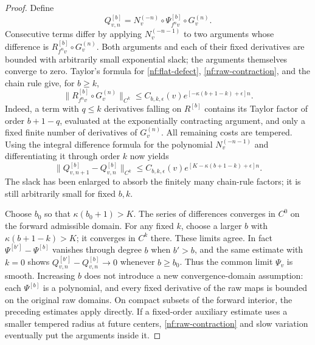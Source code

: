 \begin{proof}
Define
\begin{equation}\label{nf:limit-formula}
 Q_{v,n}^{[b]}=N_v^{(-n)}\circ\Psi_{f^nv}^{[b]}
                          \circ G_v^{(n)}.
\end{equation}
Consecutive terms differ by applying $N_v^{(-n-1)}$ to two arguments
whose difference is $R_{f^nv}^{[b]}\circ G_v^{(n)}$.
Both arguments and each of their fixed derivatives are bounded
with arbitrarily small exponential slack; the arguments themselves
converge to zero.  Taylor's formula for
\eqref{nf:flat-defect}, \eqref{nf:raw-contraction}, and the chain rule
give, for $b\geq k$,
\begin{equation}\label{nf:defect-estimate}
 \bigl\|R_{f^nv}^{[b]}\circ G_v^{(n)}\bigr\|_{C^k}
 \leq C_{b,k,\epsilon}(v)
       e^{[-\kappa(b+1-k)+\epsilon]n}.
\end{equation}
Indeed, a term with $q\leq k$ derivatives falling on $R^{[b]}$
contains its Taylor factor of order $b+1-q$, evaluated at the
exponentially contracting argument, and only a fixed finite number
of derivatives of $G_v^{(n)}$.  All remaining costs are tempered.
Using the integral difference formula for the polynomial
$N_v^{(-n-1)}$ and differentiating it through order $k$ now yields
\begin{equation}\label{nf:telescoping}
 \|Q_{v,n+1}^{[b]}-Q_{v,n}^{[b]}\|_{C^k}
 \leq C_{b,k,\epsilon}(v)
 e^{[K-\kappa(b+1-k)+\epsilon]n}.
\end{equation}
The slack has been enlarged to absorb the finitely many chain-rule
factors; it is still arbitrarily small for fixed $b,k$.

Choose $b_0$ so that $\kappa(b_0+1)>K$.  The series of differences
converges in $C^0$ on the forward admissible domain.  For any fixed
$k$, choose a larger $b$ with $\kappa(b+1-k)>K$; it converges in
$C^k$ there.  These limits agree.  In fact
$\Psi^{[b']}-\Psi^{[b]}$ vanishes through degree $b$ when $b'>b$,
and the same estimate with $k=0$ shows
$Q_{v,n}^{[b']}-Q_{v,n}^{[b]}\to0$ whenever $b\geq b_0$.
Thus the common limit $\Psi_v$ is smooth.  Increasing $b$ does not
introduce a new convergence-domain assumption: each
$\Psi^{[b]}$ is a polynomial, and every fixed derivative of the raw
maps is bounded on the original raw domains.  On compact subsets
of the forward interior, the preceding estimates apply directly.
If a fixed-order auxiliary estimate uses a smaller tempered
radius at future centers, \eqref{nf:raw-contraction} and slow
variation eventually put the arguments inside it.


\end{proof}
